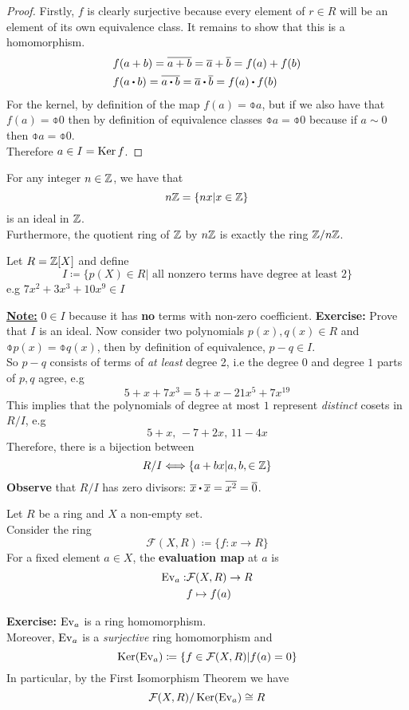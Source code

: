 \documentclass[../Main.tex]{subfiles}
\begin{document}
\begin{proof}
	Firstly, $f$ is clearly surjective because every element of $r \in R$ will be an element of its own equivalence class. 
	It remains to show that this is a homomorphism.
	\begin{align*}
		&f(a+b)=\obar{a+b} = \obar{a}+\obar{b}=f(a)+f(b)\\
		&f(a\rdot b)=\obar{a\rdot b} = \obar{a}\rdot \obar{b}=f(a)\rdot f(b)
	\end{align*}
	For the kernel, by definition of the map $f(a)=\obar{a}$, but if we also have that $f(a)=\obar{0}$ then by definition of equivalence classes $\obar{a}=\obar{0}$ because if $a\sim 0$ then $\obar{a}=\obar{0}$. \\
	Therefore $a\in I = \operatorname{Ker} f$.
\end{proof}
\begin{example}
	For any integer $n\in \mathbb{Z}$, we have that
	\[n\mathbb{Z} = \{nx|x\in \mathbb{Z}\}\] 
	is an ideal in $\mathbb{Z}$.\\
	Furthermore, the quotient ring of $\mathbb{Z}$ by $n\mathbb{Z}$ is exactly the ring $\mathbb{Z}/n\mathbb{Z}$.
\end{example}
\begin{example}
	Let $R=\mathbb{Z}[X]$ and define
	\[I \coloneqq \{p(X)\in R| \text{ all nonzero terms have degree at least 2}\}\]
	e.g $7x^2+3x^3+10x^9\in I$
\end{example}
\underline{\textbf{Note:}} $0\in I$ because it has \textbf{no} terms with non-zero coefficient.
\textbf{Exercise:} Prove that $I$ is an ideal.
Now consider two polynomials $p(x),q(x)\in R$ and $\obar{p(x)}=\obar{q(x)}$, then by definition of equivalence, $p-q\in I$.\\
So $p-q$ consists of terms of \textit{at least} degree 2, i.e the degree $0$ and degree $1$ parts of $p,q$ agree, e.g
\[5+x+7x^3=5+x-21x^5+7x^{19}\]
This implies that the polynomials of degree at most $1$ represent \textit{distinct} cosets in $R/I$, e.g
\[5+x,\, -7+2x,\,11-4x\]
Therefore, there is a bijection between
\[R/I \Longleftrightarrow \{a+bx|a,b,\in \mathbb{Z}\}\]
\textbf{Observe} that $R/I$ has zero divisors: $\obar{x}\rdot \obar{x}=\obar{x^2}=\obar{0}$.
\begin{example}
	Let $R$ be a ring and $X$ a non-empty set.\\
	Consider the ring
	\[\mathcal{F}(X,R) \coloneqq \{f:x\to R\}\]
	For a fixed element $a\in X$, the \textbf{evaluation map} at $a$ is
	\begin{align*}
		\operatorname{Ev}_a : &\mathcal{F}(X,R)\to R\\
		&f\mapsto f(a)
	\end{align*}
\end{example}
\textbf{Exercise: } $\operatorname{Ev}_a$ is a ring homomorphism.\\
Moreover, $\operatorname{Ev}_a$ is a \textit{surjective} ring homomorphism and 
\[\operatorname{Ker}(\operatorname{Ev}_a)\coloneqq \{f\in \mathcal{F}(X,R)|f(a)=0\}\]
In particular, by the First Isomorphism Theorem we have
\[\mathcal{F}(X,R)/\operatorname{Ker}(\operatorname{Ev}_a)\cong R\]
\end{document}
